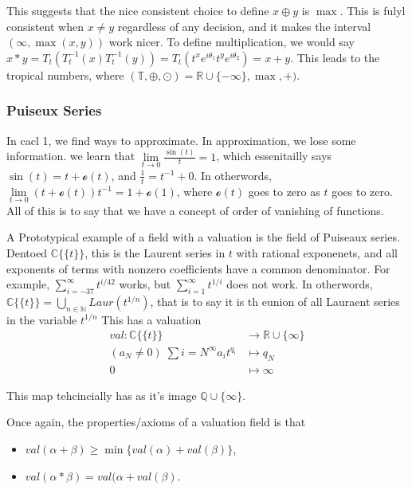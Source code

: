 \documentclass[12pt]{memoir}
\theoremstyle{definition}
\def\QQ{{\mathbb Q}}
\def\RR{{\mathbb R}}
\def\CC{{\mathbb C}}
\def\NN{{\mathbb N}}
\begin{document}
This suggests that the nice consistent choice to define $x\oplus y$ is $\max$. This is fulyl consistent when $x \neq y$ regardless of any decision, and it makes the interval $(\infty, \max(x,y))$ work nicer. To define multiplication, we would say $x*y = T_t(T_t^{-1}(x) T_t^{-1}(y))= T_t(t^xe^{i\theta_1}t^ye^{i\theta_2}) = x+y$. This leads to the tropical numbers, where
$(\mathbb{T}, \oplus, \odot) = \RR\cup \{-\infty\}, \max, +)$.







\subsubsection{Puiseux  Series}


In cacl 1, we find ways to approximate. In approximation, we lose some information. we learn that $\lim\limits_{t\rightarrow 0} \frac{\sin(t)}{t} =1$, which essenitailly says $\sin(t) = t+\mathscr{o}(t)$, and $\frac{1}{t} = t^{-1} + 0$. In otherwords, $\lim\limits_{t \rightarrow 0} (t+\mathscr{o}(t))t^{-1} = 1 + \mathscr{o}(1)$, where $ \mathscr{o}(t)$ goes to zero as $t$ goes to zero. All of this is to say that we have a concept of order of vanishing of functions.




A Prototypical example of a field with a valuation is the field of Puiseaux series. Dentoed $\CC\{\{t\}\}$, this is the Laurent series in $t$ with rational exponenets, and all exponents of terms with nonzero coefficients have a common denominator. For example, $\sum\limits_{i=-37}^{\infty} t^{i/42}$ works, but $\sum\limits_{i=1}^\infty t^{1/i}$ does not work. In otherwords, $\CC\{\{t\}\} = \bigcup\limits_{n \in \NN} Laur(t^{1/n})$, that is to say it is th eunion of all Lauraent series in the variable $t^{1/n}$ This has a valuation
\begin{align}
    val: \CC\{\{t\}\} &\rightarrow \RR \cup \{\infty\}
    \\
    (a_N\neq 0)\; \sum\limits{i=N}^\infty a_it^{q_i} &\mapsto q_N
    \\
    0 &\mapsto \infty
\end{align}

This map tehcincially has as it's image $\QQ \cup \{\infty\}$.


Once again, the properties/axioms of a valuation field is that
\begin{itemize}
    \item $val(\alpha + \beta) \geq \min \{val(\alpha) + val(\beta)\}$,
    \item $val(\alpha * \beta) = val(\alpha + val(\beta)$.
\end{itemize}
\end{document}
